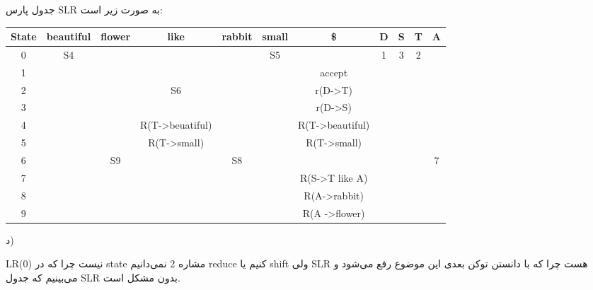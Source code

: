جدول پارس SLR به صورت زیر است:
\begin{latin}
\begin{center}
\hspace*{-0.5cm}
\begin{tabular}{|c|c|c|c|c|c|c|c|c|c|c|}
\hline
State & beautiful & flower & like                         & rabbit & small & \$                           & D & S & T & A \\ \hline
0     & S4        &        &                              &        & S5    &                              & 1 & 3 & 2 &   \\ \hline
1     &           &        &                              &        &       & accept                       &   &   &   &   \\ \hline
2     &           &        & S6                           &        &       & r(D-\textgreater{}T)         &   &   &   &   \\ \hline
3     &           &        &                             &        &       & r(D-\textgreater{}S)         &   &   &   &   \\ \hline
4     &           &        & R(T-\textgreater{}beuatiful) &        &       & R(T-\textgreater{}beautiful) &   &   &   &   \\ \hline
5     &           &        & R(T-\textgreater{}small)     &        &       & R(T-\textgreater{}small)     &   &   &   &   \\ \hline
6     &           & S9     &                              & S8     &       &                              &   &   &   & 7 \\ \hline
7     &           &        &                              &        &       & R(S-\textgreater{}T like A)  &   &   &   &   \\ \hline
8     &           &        &                              &        &       & R(A-\textgreater rabbit)     &   &   &   &   \\ \hline
9     &           &        &                              &        &       & R(A -\textgreater flower)    &   &   &   &   \\ \hline
\end{tabular}
\end{center}
\end{latin}


د)

LR(0) نیست چرا که در state مشاره  2 نمی‌دانیم reduce کنیم یا shift ولی SLR هست چرا که با دانستن توکن بعدی این موضوع رفع می‌شود و می‌بینیم که جدول SLR  بدون مشکل است.
